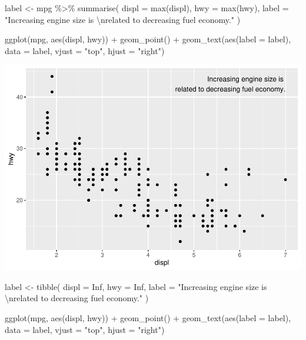 \documentclass[
]{article}
\newenvironment{Shaded}{\begin{snugshade}}{\end{snugshade}}
\newcommand{\AttributeTok}[1]{\textcolor[rgb]{0.77,0.63,0.00}{#1}}
\newcommand{\ConstantTok}[1]{\textcolor[rgb]{0.00,0.00,0.00}{#1}}
\newcommand{\FunctionTok}[1]{\textcolor[rgb]{0.00,0.00,0.00}{#1}}
\newcommand{\NormalTok}[1]{#1}
\newcommand{\OtherTok}[1]{\textcolor[rgb]{0.56,0.35,0.01}{#1}}
\newcommand{\SpecialCharTok}[1]{\textcolor[rgb]{0.00,0.00,0.00}{#1}}
\newcommand{\StringTok}[1]{\textcolor[rgb]{0.31,0.60,0.02}{#1}}
\begin{document}
\begin{Shaded}
\begin{Highlighting}[]
\NormalTok{label }\OtherTok{\textless{}{-}}\NormalTok{ mpg }\SpecialCharTok{\%\textgreater{}\%}
  \FunctionTok{summarise}\NormalTok{(}
    \AttributeTok{displ =} \FunctionTok{max}\NormalTok{(displ),}
    \AttributeTok{hwy =} \FunctionTok{max}\NormalTok{(hwy),}
    \AttributeTok{label =} \StringTok{"Increasing engine size is }\SpecialCharTok{\textbackslash{}n}\StringTok{related to decreasing fuel economy."}
\NormalTok{  )}

\FunctionTok{ggplot}\NormalTok{(mpg, }\FunctionTok{aes}\NormalTok{(displ, hwy)) }\SpecialCharTok{+}
  \FunctionTok{geom\_point}\NormalTok{() }\SpecialCharTok{+}
  \FunctionTok{geom\_text}\NormalTok{(}\FunctionTok{aes}\NormalTok{(}\AttributeTok{label =}\NormalTok{ label), }\AttributeTok{data =}\NormalTok{ label, }\AttributeTok{vjust =} \StringTok{"top"}\NormalTok{, }\AttributeTok{hjust =} \StringTok{"right"}\NormalTok{)}
\end{Highlighting}
\end{Shaded}

\includegraphics{Journal_files/figure-latex/unnamed-chunk-59-2.pdf}

\begin{Shaded}
\begin{Highlighting}[]
\NormalTok{label }\OtherTok{\textless{}{-}} \FunctionTok{tibble}\NormalTok{(}
  \AttributeTok{displ =} \ConstantTok{Inf}\NormalTok{,}
  \AttributeTok{hwy =} \ConstantTok{Inf}\NormalTok{,}
  \AttributeTok{label =} \StringTok{"Increasing engine size is }\SpecialCharTok{\textbackslash{}n}\StringTok{related to decreasing fuel economy."}
\NormalTok{)}

\FunctionTok{ggplot}\NormalTok{(mpg, }\FunctionTok{aes}\NormalTok{(displ, hwy)) }\SpecialCharTok{+}
  \FunctionTok{geom\_point}\NormalTok{() }\SpecialCharTok{+}
  \FunctionTok{geom\_text}\NormalTok{(}\FunctionTok{aes}\NormalTok{(}\AttributeTok{label =}\NormalTok{ label), }\AttributeTok{data =}\NormalTok{ label, }\AttributeTok{vjust =} \StringTok{"top"}\NormalTok{, }\AttributeTok{hjust =} \StringTok{"right"}\NormalTok{)}
\end{Highlighting}
\end{Shaded}
\end{document}
